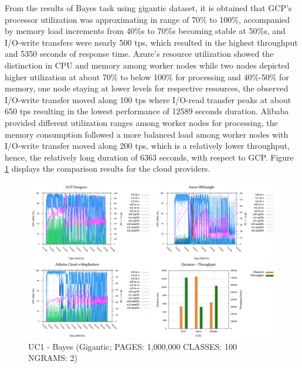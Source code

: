 \documentclass[review]{elsarticle}
\begin{document}
	From the results of Bayes task using gigantic dataset, it is obtained that GCP's processor utilization was approximating in range of 70\% to 100\%, accompanied by memory load increments from 40\%s to 70\%s becoming stable at 50\%s, and I/O-write transfers were nearly 500 tps, which resulted in the highest throughput and 5350 seconds of response time. Azure's resource utilization showed the distinction in CPU and memory among worker nodes while two nodes depicted higher utilization at about 70\% to below 100\% for processing and 40\%-50\% for memory, one node staying at lower levels for respective resources, the observed I/O-write transfer moved along 100 tps where I/O-read transfer peaks at about 650 tps resulting in the lowest performance of 12589 seconds duration. Alibaba provided different utilization ranges among worker nodes for processing, the memory consumption followed a more balanced load among worker nodes with I/O-write transfer moved along 200 tps, which is a relatively lower throughput, hence, the relatively long duration of 6363 seconds, with respect to GCP. Figure \ref{fig:uc1-bayes-g-cmidt} displays the comparison results for the cloud providers.
	
	\begin{figure}[p]
		\caption{UC1 - Bayes (Gigantic; PAGES: 1,000,000 CLASSES: 100 NGRAMS: 2)}
		\label{fig:uc1-bayes-g-cmidt}
		\includegraphics[width=\textwidth]{uc1-bayes-g-cmidt}
		\centering
	\end{figure}
	
	
\end{document}
